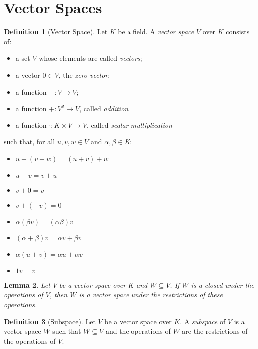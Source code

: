 \documentclass{book}
\newtheorem{lm}{Lemma}[chapter]
\theoremstyle{definition}
\newtheorem{df}[lm]{Definition}
\begin{document}
  \section{Vector Spaces}
  
  \begin{df}[Vector Space]
    Let $K$ be a field. A \emph{vector space} $V$ over $K$ consists of:
    \begin{itemize}
      \item a set $V$ whose elements are called \emph{vectors};
      \item a vector $0 \in V$, the \emph{zero vector};
      \item a function $- : V \rightarrow V$;
      \item a function $+ : V^2 \rightarrow V$, called \emph{addition};
      \item a function $\cdot : K \times V \rightarrow V$, called \emph{scalar 
        multiplication}
    \end{itemize}
    such that, for all $u, v, w \in V$ and $\alpha, \beta \in K$:
    \begin{itemize}
      \item $u + (v + w) = (u + v) + w$
      \item $u + v = v + u$
      \item $v + 0 = v$
      \item $v + (-v) = 0$
      \item $\alpha (\beta v) = (\alpha \beta) v$
      \item $(\alpha + \beta) v = \alpha v + \beta v$
      \item $\alpha (u + v) = \alpha u + \alpha v$
      \item $1 v = v$
    \end{itemize}
  \end{df}
  
  \begin{lm}
    Let $V$ be a vector space over $K$ and $W \subseteq V$. If $W$ is a closed 
    under the operations of $V$, then $W$ is a vector space under the 
    restrictions 
    of these operations.
  \end{lm}
  
  \begin{df}[Subspace]
    Let $V$ be a vector space over $K$. A \emph{subspace} of $V$ is a vector 
    space $W$ such that $W \subseteq V$ and the operations of $W$ are the 
    restrictions of the operations of $V$.
  \end{df}
  
\end{document}
